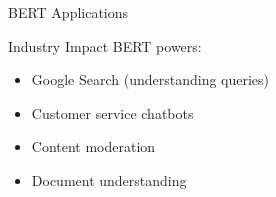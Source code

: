 \documentclass[aspectratio=169]{beamer}
\begin{document}
\begin{frame}[shrink=10]{BERT Applications 🚀}
\vspace{1em}

\begin{block}{Industry Impact}
BERT powers:
\begin{itemize}\setlength{\itemsep}{0pt}
    \item Google Search (understanding queries)
    \item Customer service chatbots
    \item Content moderation
    \item Document understanding
\end{itemize}
\end{block}
\end{frame}

\end{document}
